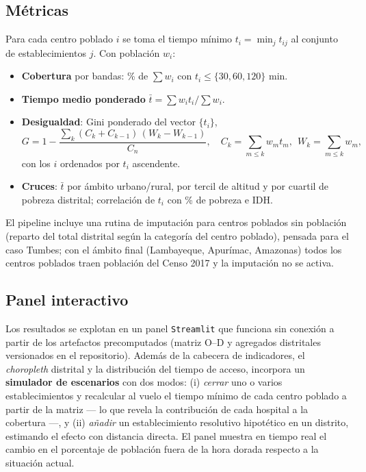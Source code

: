 \documentclass[11pt,a4paper]{article}
\begin{document}
\subsection{M\'etricas}
Para cada centro poblado $i$ se toma el tiempo m\'inimo
$t_i=\min_j t_{ij}$ al conjunto de establecimientos $j$. Con poblaci\'on $w_i$:
\begin{itemize}
  \item \textbf{Cobertura} por bandas: \% de $\sum w_i$ con $t_i\le\{30,60,120\}$ min.
  \item \textbf{Tiempo medio ponderado} $\bar t = \sum w_i t_i / \sum w_i$.
  \item \textbf{Desigualdad}: Gini ponderado del vector $\{t_i\}$,
  \begin{equation}
    G = 1 - \frac{\sum_{k} (C_k + C_{k-1})\,(W_k - W_{k-1})}{C_n},\quad
    C_k = \!\!\sum_{m\le k}\! w_m t_m,\ \ W_k=\!\!\sum_{m\le k}\! w_m,
  \end{equation}
  con los $i$ ordenados por $t_i$ ascendente.
  \item \textbf{Cruces}: $\bar t$ por \'ambito urbano/rural, por tercil de
        altitud y por cuartil de pobreza distrital; correlaci\'on de $t_i$ con
        \% de pobreza e IDH.
\end{itemize}
El pipeline incluye una rutina de imputaci\'on para centros poblados sin
poblaci\'on (reparto del total distrital seg\'un la categor\'ia del centro
poblado), pensada para el caso Tumbes; con el \'ambito final (Lambayeque,
Apur\'imac, Amazonas) todos los centros poblados traen poblaci\'on del Censo
2017 y la imputaci\'on no se activa.

\subsection{Panel interactivo}
Los resultados se explotan en un panel \texttt{Streamlit} que funciona sin
conexi\'on a partir de los artefactos precomputados (matriz O--D y agregados
distritales versionados en el repositorio). Adem\'as de la cabecera de
indicadores, el \emph{choropleth} distrital y la distribuci\'on del tiempo de
acceso, incorpora un \textbf{simulador de escenarios} con dos modos: (i)
\emph{cerrar} uno o varios establecimientos y recalcular al vuelo el tiempo
m\'inimo de cada centro poblado a partir de la matriz --- lo que revela la
contribuci\'on de cada hospital a la cobertura ---, y (ii) \emph{a\~nadir} un
establecimiento resolutivo hipot\'etico en un distrito, estimando el efecto con
distancia directa. El panel muestra en tiempo real el cambio en el porcentaje
de poblaci\'on fuera de la hora dorada respecto a la situaci\'on actual.
\end{document}
